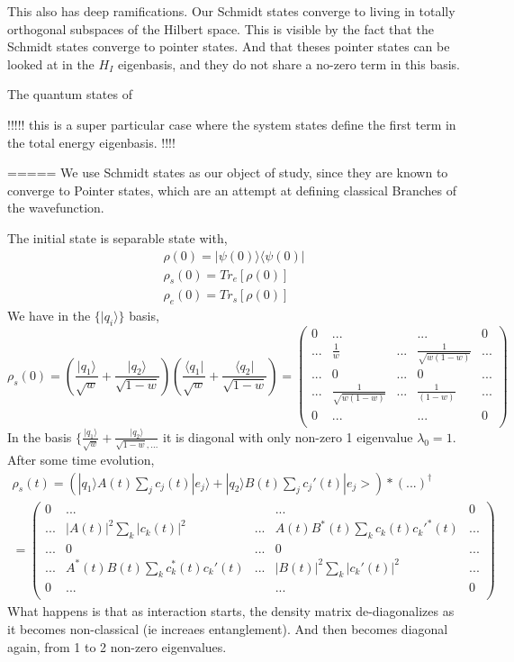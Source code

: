 \documentclass{article}
\begin{document}
This also has deep ramifications. Our Schmidt states converge to living in totally orthogonal subspaces of the Hilbert space. This is visible by the fact that the Schmidt states converge to pointer states. And that theses pointer states can be looked at in the $H_I$ eigenbasis, and they do not share a no-zero term in this basis.

The quantum states of 

!!!!!
this is a super particular case where the system states define the first term in the total energy eigenbasis. 
!!!!



=====
We use Schmidt states as our object of study, since they are known to converge to Pointer states, which are an attempt at defining classical Branches of the wavefunction.


The initial state is separable state with,
\begin{align*}
    \rho(0)=|\psi(0)\rangle\langle \psi(0)| \\
    \rho_s(0) = Tr_e[\rho(0)] \\
    \rho_e(0)= Tr_s[\rho(0)]
\end{align*}
We have in the $\{|q_i\rangle\}$ basis,
\begin{equation}
    \rho_s(0) = (\frac{|q_1\rangle}{\sqrt{w}}+\frac{|q_2\rangle}{\sqrt{1-w}})(\frac{\langle q_1|}{\sqrt{w}}+\frac{\langle q_2|}{\sqrt{1-w}}) = 
    \begin{pmatrix}
        0 & ... & & ... & 0 \\
        ... & \frac{1}{w} & ... & \frac{1}{\sqrt{w(1-w)}} & ... \\
        ... & 0 & ... & 0 & ... \\
        ... & \frac{1}{\sqrt{w(1-w)}} & ... & \frac{1}{(1-w)} & ... \\
        0 & ... & & ... & 0 \\
    \end{pmatrix}
\end{equation}
In the basis $\{\frac{|q_1\rangle}{\sqrt{w}}+\frac{|q_2\rangle}{\sqrt{1-w},...}$ it is diagonal with only non-zero 1 eigenvalue $\lambda_0=1$.
After some time evolution,
\begin{align*}
    \rho_s(t) = (|q_1\rangle A(t)\sum_jc_j(t)|e_j\rangle+|q_2\rangle B(t)\sum_jc_j'(t)|e_j>)*(...)^{\dagger} \\
    =\begin{pmatrix}
        0 & ... & & ... & 0 \\
        ... & |A(t)|^2\sum_k|c_k(t)|^2 & ... & A(t)B^*(t)\sum_kc_k(t)c_k'^*(t) & ... \\
        ... & 0 & ... & 0 & ... \\
        ... & A^*(t)B(t)\sum_kc_k^*(t)c_k'(t) & ... & |B(t)|^2\sum_k|c_k'(t)|^2 & ... \\
        0 & ... & & ... & 0 \\
    \end{pmatrix}
\end{align*}
What happens is that as interaction starts, the density matrix de-diagonalizes as it becomes non-classical (ie increaes entanglement). And then becomes diagonal again, from 1 to 2 non-zero eigenvalues. 
\end{document}
